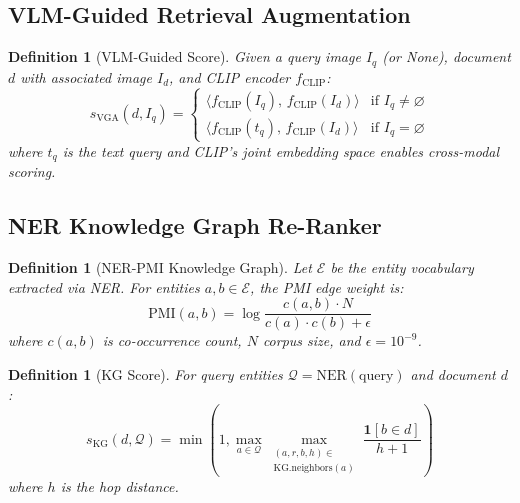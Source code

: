 \documentclass[10pt,conference]{IEEEtran}
\theoremstyle{ieeethm}
\theoremstyle{ieeedef}
\newtheorem{definition}[theorem]{Definition}
\theoremstyle{ieeeremark}
\begin{document}
\subsection{VLM-Guided Retrieval Augmentation}

\begin{definition}[VLM-Guided Score]
\label{def:vga}
Given a query image $I_q$ (or None), document $d$ with associated image $I_d$, and CLIP encoder $f_\text{CLIP}$:
\begin{equation}
s_\text{VGA}(d, I_q) = \begin{cases}
\langle f_\text{CLIP}(I_q),\, f_\text{CLIP}(I_d) \rangle & \text{if } I_q \neq \varnothing\\
\langle f_\text{CLIP}(t_q),\, f_\text{CLIP}(I_d) \rangle & \text{if } I_q = \varnothing
\end{cases}
\label{eq:vga}
\end{equation}
where $t_q$ is the text query and CLIP's joint embedding space enables cross-modal scoring.
\end{definition}

\subsection{NER Knowledge Graph Re-Ranker}

\begin{definition}[NER-PMI Knowledge Graph]
\label{def:kg}
Let $\mathcal{E}$ be the entity vocabulary extracted via NER. For entities $a, b \in \mathcal{E}$, the PMI edge weight is:
\begin{equation}
\text{PMI}(a,b) = \log\frac{c(a,b) \cdot N}{c(a) \cdot c(b) + \epsilon}
\label{eq:pmi}
\end{equation}
where $c(a,b)$ is co-occurrence count, $N$ corpus size, and $\epsilon{=}10^{-9}$.
\end{definition}

\begin{definition}[KG Score]
\label{def:kg_score}
For query entities $\mathcal{Q} = \text{NER}(\text{query})$ and document $d$:
\begin{equation}
s_{\text{KG}}(d, \mathcal{Q}) = \min\!\left(1, \max_{a \in \mathcal{Q}} \max_{\substack{(a,r,b,h) \in \\ \text{KG.neighbors}(a)}} \frac{\mathbf{1}[b \in d]}{h+1}\right)
\label{eq:kg_score}
\end{equation}
where $h$ is the hop distance.
\end{definition}
\end{document}

